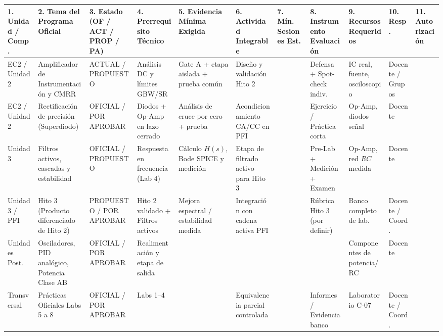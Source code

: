 \documentclass[10pt, a4paper, landscape]{article}
\begin{document}
\begin{table}[htbp]
    \centering
    \scriptsize
    \setlength{\tabcolsep}{4pt}
    \renewcommand{\arraystretch}{1.45}
    \begin{tabularx}{\textwidth}{|P{1.9cm}|P{2.5cm}|P{2.0cm}|P{2.0cm}|P{2.6cm}|P{2.4cm}|P{1.9cm}|P{2.0cm}|P{2.0cm}|P{1.5cm}|Y|}
    \hline
    \textbf{1. Unidad / Comp.} & \textbf{2. Tema del Programa Oficial} & \textbf{3. Estado (OF / ACT / PROP / PA)} & \textbf{4. Prerrequisito Técnico} & \textbf{5. Evidencia Mínima Exigida} & \textbf{6. Actividad Integrable} & \textbf{7. Mín. Sesiones Est.} & \textbf{8. Instrumento Evaluación} & \textbf{9. Recursos Requeridos} & \textbf{10. Resp.} & \textbf{11. Autorización} \\ \hline
    EC2 / Unidad 2 & Amplificador de Instrumentación y CMRR & {\ttfamily ACTUAL / PROPUESTO} & Análisis DC y límites GBW/SR & Gate A + etapa aislada + prueba común & Diseño y validación Hito 2 & {} & Defensa + Spot-check indiv. & IC real, fuente, osciloscopio & Docente / Grupos & {} \\ \hline
    EC2 / Unidad 2 & Rectificación de precisión (Superdiodo) & {\ttfamily OFICIAL / POR APROBAR} & Diodos + Op-Amp en lazo cerrado & Análisis de cruce por cero + prueba & Acondicionamiento CA/CC en PFI & {} & Ejercicio / Práctica corta & Op-Amp, diodos señal & Docente & {} \\ \hline
    Unidad 3 & Filtros activos, cascadas y estabilidad & {\ttfamily OFICIAL / PROPUESTO} & Respuesta en frecuencia (Lab 4) & Cálculo $H(s)$, Bode SPICE y medición & Etapa de filtrado activo para Hito 3 & {} & Pre-Lab + Medición + Examen & Op-Amp, red $RC$ medida & Docente & {} \\ \hline
    Unidad 3 / PFI & Hito 3 (Producto diferenciado de Hito 2) & {\ttfamily PROPUESTO / POR APROBAR} & Hito 2 validado + Filtros activos & Mejora espectral / estabilidad medida & Integración con cadena activa PFI & {} & Rúbrica Hito 3 (por definir) & Banco completo de lab. & Docente / Coord. & {} \\ \hline
    Unidades Post. & Osciladores, PID analógico, Potencia Clase AB & {\ttfamily OFICIAL / POR APROBAR} & Realimentación y etapa de salida & {} & {} & {} & {} & Componentes de potencia/RC & Docente & {} \\ \hline
    Transversal & Prácticas Oficiales Labs 5 a 8 & {\ttfamily OFICIAL / POR APROBAR} & Labs 1--4 & {} & Equivalencia parcial controlada & {} & Informes / Evidencia banco & Laboratorio C-07 & Docente / Coord. & {} \\ \hline
    \end{tabularx}
\end{table}
\end{document}
